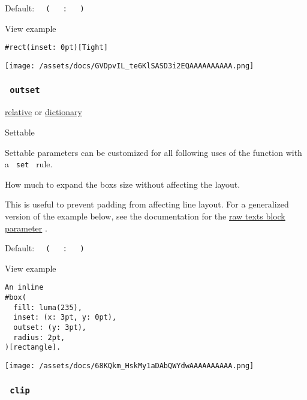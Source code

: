 Default:
\texttt{\ }{\texttt{\ (\ }}\texttt{\ }{\texttt{\ :\ }}\texttt{\ }{\texttt{\ )\ }}\texttt{\ }


View example

\begin{verbatim}
#rect(inset: 0pt)[Tight]
\end{verbatim}

\texttt{[image: /assets/docs/GVDpvIL\_te6KlSASD3i2EQAAAAAAAAAA.png]}

\subsubsection{\texorpdfstring{\texttt{\ outset\ }}{ outset }}\label{parameters-outset}

\href{/docs/reference/layout/relative/}{relative} {or}
\href{/docs/reference/foundations/dictionary/}{dictionary}

{{ Settable }}

\label{parameters-outset-settable-tooltip}
Settable parameters can be customized for all following uses of the
function with a \texttt{\ set\ } rule.

How much to expand the box\textquotesingle s size without affecting the
layout.

This is useful to prevent padding from affecting line layout. For a
generalized version of the example below, see the documentation for the
\href{/docs/reference/text/raw/\#parameters-block}{raw
text\textquotesingle s block parameter} .

Default:
\texttt{\ }{\texttt{\ (\ }}\texttt{\ }{\texttt{\ :\ }}\texttt{\ }{\texttt{\ )\ }}\texttt{\ }


View example

\begin{verbatim}
An inline
#box(
  fill: luma(235),
  inset: (x: 3pt, y: 0pt),
  outset: (y: 3pt),
  radius: 2pt,
)[rectangle].
\end{verbatim}

\texttt{[image: /assets/docs/68KQkm\_HskMy1aDAbQWYdwAAAAAAAAAA.png]}

\subsubsection{\texorpdfstring{\texttt{\ clip\ }}{ clip }}\label{parameters-clip}

